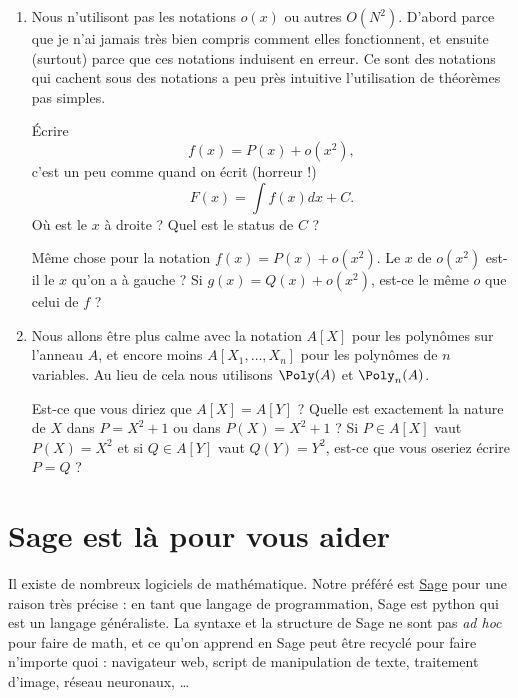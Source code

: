 \begin{enumerate}
    \item
        Nous n'utilisont pas les notations \( o(x)\) ou autres \( O(N^2)\). D'abord parce que je n'ai jamais très bien compris comment elles fonctionnent, et ensuite (surtout) parce que ces notations induisent en erreur. Ce sont des notations qui cachent sous des notations a peu près intuitive l'utilisation de théorèmes pas simples.

        Écrire
        \begin{equation}
            f(x)=P(x)+o(x^2),
        \end{equation}
        c'est un peu comme quand on écrit (horreur !)
        \begin{equation}
            F(x)=\int f(x)dx+C.
        \end{equation}
        Où est le \( x\) à droite ? Quel est le status de \( C \) ? 

        Même chose pour la notation \( f(x)=P(x)+o(x^2)\). Le \( x\) de \( o(x^2)\) est-il le \( x\) qu'on a à gauche ? Si \( g(x)=Q(x)+o(x^2)\), est-ce le même \( o\) que celui de \( f\) ?
    \item
        Nous allons être plus calme avec la notation \( A[X]\) pour les polynômes sur l'anneau \( A\), et encore moins \( A[X_1,\ldots, X_n]\) pour les polynômes de \( n\) variables. Au lieu de cela nous utilisons \( \Poly(A)\) et \( \Poly_n(A)\).

        Est-ce que vous diriez que \( A[X]=A[Y]\) ? Quelle est exactement la nature de \( X\) dans \( P=X^2+1\) ou dans \( P(X)=X^2+1\) ? Si \( P\in A[X]\) vaut \( P(X)=X^2\)  et si \( Q\in A[Y]\) vaut \( Q(Y)=Y^2\), est-ce que vous oseriez écrire \( P=Q\) ?
\end{enumerate}

\section{Sage est là pour vous aider}

Il existe de nombreux logiciels de mathématique. Notre préféré est \href{http://www.sagemath.org}{Sage} pour une raison très précise : en tant que langage de programmation, Sage est python qui est un langage généraliste. La syntaxe et la structure de Sage ne sont pas \emph{ad hoc} pour faire de math, et ce qu'on apprend en Sage peut être recyclé pour faire n'importe quoi : navigateur web, script de manipulation de texte, traitement d'image, réseau neuronaux, \ldots

